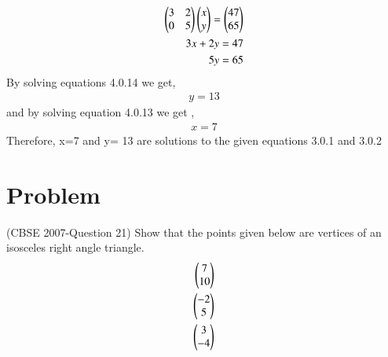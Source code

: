 \documentclass[journal,12pt,twocolumn]{IEEEtran}
\begin{document}
 \begin{align}
\myvec{3&2\\0&5} \myvec{x\\y}= \myvec{47\\65}\\
\medskip
3x+2y= 47\\
\medskip
5y=65
\end{align}
By solving equations 4.0.14 we get,
\begin{align}
y= 13
\end{align}
and by solving equation 4.0.13 we get ,
\begin{align}
x=7
\end{align}
Therefore, x=7 and y= 13 are solutions to the given equations 3.0.1 and 3.0.2
\section{Problem}
(CBSE 2007-Question 21) Show that the points given below are vertices of an isosceles right angle triangle.
\begin{align}
\begin{pmatrix}7\\10\end{pmatrix}\\ \begin{pmatrix}-2\\5\end{pmatrix} \\ \begin{pmatrix}3\\-4\end{pmatrix}
\end{align}
\end{document}

